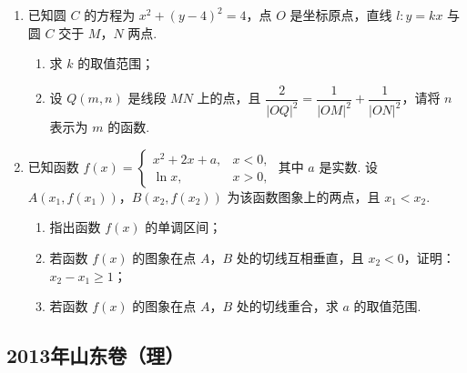 \begin{description}
\begin{enumerate}[leftmargin=5pt]
        \item 已知圆 \(C\) 的方程为 \(x^{2}+\left(y-4\right)^{2}=4\)，点 \(O\) 是坐标原点，直线 \(l:y=kx\) 与圆 \(C\) 交于 \(M\)，\(N\) 两点.
\begin{enumerate}
\item 求 \(k\) 的取值范围；
\item 设 \(Q(m,n)\) 是线段 \(MN\) 上的点，且 \(\dfrac{2}{|OQ|^{2}}=\dfrac{1}{|OM|^{2}}+\dfrac{1}{|ON|^{2}}\)，请将 \(n\) 表示为 \(m\) 的函数.
\end{enumerate}

        \item 已知函数 \(f(x)=\begin{cases}
x^2+2x+a,&x<0,\\
\ln x,&x>0,
\end{cases}\) 其中 \(a\) 是实数. 设 \(A(x_1,f(x_1))\)，\(B(x_2,f(x_2))\) 为该函数图象上的两点，且 \(x_1<x_2\).
\begin{enumerate}
\item 指出函数 \(f(x)\) 的单调区间；
\item 若函数 \(f(x)\) 的图象在点 \(A\)，\(B\) 处的切线互相垂直，且 \(x_2<0\)，证明：\(x_2-x_1\geqslant1\)；
\item 若函数 \(f(x)\) 的图象在点 \(A\)，\(B\) 处的切线重合，求 \(a\) 的取值范围.
\end{enumerate}

    \end{enumerate}

\end{description}


\subsection{2013年山东卷（理）}\label{gk:2013年山东卷（理）}

